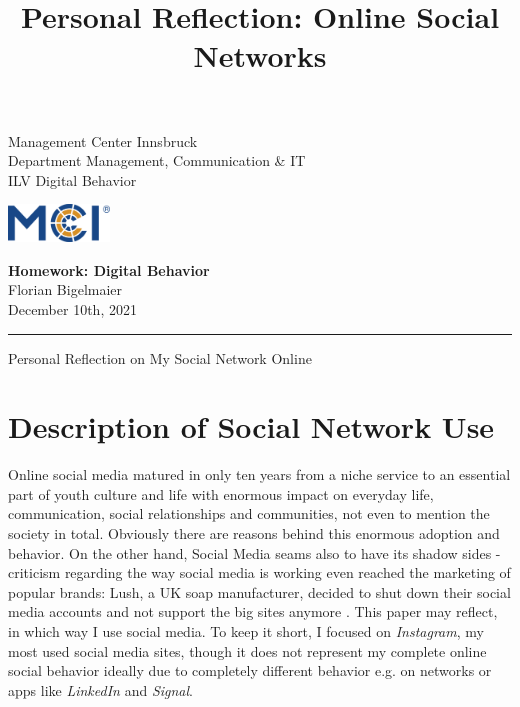 \documentclass[11pt,letterpaper]{article}
\newcommand{\fontsmall}{\fontsize{7pt}{10pt}\selectfont}
\newcommand{\fontnormal}{\fontsize{11pt}{16pt}\selectfont}
\newcommand{\headline}{\fontsize{17pt}{26pt}\selectfont}
\begin{document}
   \title{Personal Reflection: Online Social Networks}



\noindent\begin{minipage}{0.5\textwidth}
\fontsmall
Management Center Innsbruck \\
Department Management, Communication \& IT  \\
ILV Digital Behavior


\end{minipage}%
\hfill%
\begin{minipage}{0.3\textwidth}\raggedleft
\includegraphics[height=1.0cm]{mci-logo.png}

\end{minipage}



\begin{center}
\textbf{Homework: Digital Behavior}\\   %
Florian Bigelmaier\\                         %
December 10th, 2021\\                         %
\end{center}
\rule{\linewidth}{0.1mm}




\headline \begin{center}
Personal Reflection on My Social Network Online
\end{center}
\fontnormal

\section*{Description of Social Network Use}
\begin{center}
 \autocite[][]{Perrin.2015}
\end{center}

Online social media matured in only ten years from a niche service to an essential part of youth culture and life with enormous impact on everyday life, communication, social relationships and communities, not even to mention the society in total. Obviously there are reasons behind this enormous adoption and behavior. On the other hand, Social Media seams also to have its shadow sides - criticism regarding the way social media is working even reached the marketing of popular brands: Lush, a UK soap manufacturer, decided to shut down their social media accounts and not support the big sites anymore \autocite[][]{Wood.2021}. This paper may reflect, in which way I use social media. To keep it short, I focused on \textit{Instagram}, my most used social media sites, though it does not represent my complete online social behavior ideally due to completely different behavior e.g. on networks or apps like \textit{LinkedIn} and \textit{Signal}.
\end{document}
